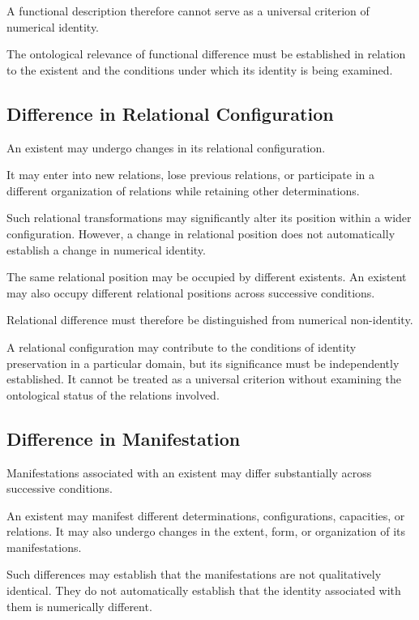 A functional description therefore cannot serve
as a universal criterion of numerical identity.

The ontological relevance of functional difference
must be established in relation to the existent
and the conditions under which its identity is
being examined.

\subsection{Difference in Relational Configuration}

An existent may undergo changes in its relational
configuration.

It may enter into new relations, lose previous
relations, or participate in a different organization
of relations while retaining other determinations.

Such relational transformations may significantly
alter its position within a wider configuration.
However, a change in relational position does not
automatically establish a change in numerical identity.

The same relational position may be occupied by
different existents. An existent may also occupy
different relational positions across successive
conditions.

Relational difference must therefore be distinguished
from numerical non-identity.

A relational configuration may contribute to the
conditions of identity preservation in a particular
domain, but its significance must be independently
established. It cannot be treated as a universal
criterion without examining the ontological status
of the relations involved.

\subsection{Difference in Manifestation}

Manifestations associated with an existent may
differ substantially across successive conditions.

An existent may manifest different determinations,
configurations, capacities, or relations. It may
also undergo changes in the extent, form, or organization
of its manifestations.

Such differences may establish that the manifestations
are not qualitatively identical. They do not
automatically establish that the identity associated
with them is numerically different.

